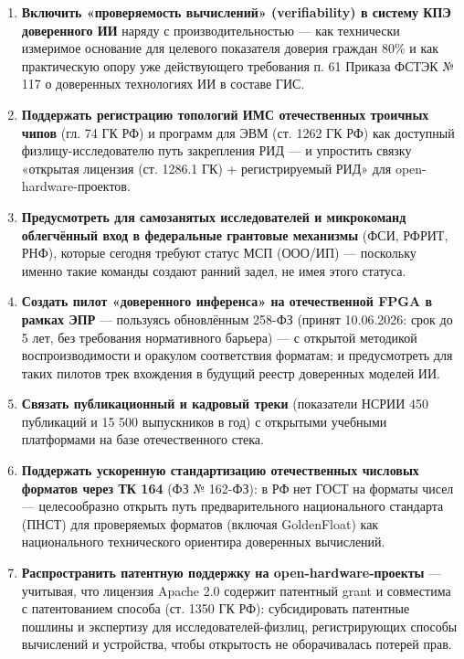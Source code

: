 \documentclass[
  russian,
]{article}
\providecommand{\tightlist}{%
  \setlength{\itemsep}{0pt}\setlength{\parskip}{0pt}}
\begin{document}
\begin{enumerate}
\def\labelenumi{\arabic{enumi}.}
\tightlist
\item
  \textbf{Включить «проверяемость вычислений» (verifiability) в систему
  КПЭ доверенного ИИ} наряду с производительностью --- как технически
  измеримое основание для целевого показателя доверия граждан 80\% и как
  практическую опору уже действующего требования п. 61 Приказа ФСТЭК №
  117 о доверенных технологиях ИИ в составе ГИС.
\item
  \textbf{Поддержать регистрацию топологий ИМС отечественных троичных
  чипов} (гл. 74 ГК РФ) и программ для ЭВМ (ст. 1262 ГК РФ) как
  доступный физлицу-исследователю путь закрепления РИД --- и упростить
  связку «открытая лицензия (ст. 1286.1 ГК) + регистрируемый РИД» для
  open-hardware-проектов.
\item
  \textbf{Предусмотреть для самозанятых исследователей и микрокоманд
  облегчённый вход в федеральные грантовые механизмы} (ФСИ, РФРИТ, РНФ),
  которые сегодня требуют статус МСП (ООО/ИП) --- поскольку именно такие
  команды создают ранний задел, не имея этого статуса.
\item
  \textbf{Создать пилот «доверенного инференса» на отечественной
  FPGA в рамках ЭПР} --- пользуясь обновлённым 258-ФЗ (принят
  10.06.2026: срок до 5 лет, без требования нормативного барьера) --- с
  открытой методикой воспроизводимости и оракулом соответствия форматам;
  и предусмотреть для таких пилотов трек вхождения в будущий реестр
  доверенных моделей ИИ.
\item
  \textbf{Связать публикационный и кадровый треки} (показатели НСРИИ 450
  публикаций и 15 500 выпускников в год) с открытыми учебными
  платформами на базе отечественного стека.
\item
  \textbf{Поддержать ускоренную стандартизацию отечественных числовых
  форматов через ТК 164} (ФЗ № 162-ФЗ): в РФ нет ГОСТ на форматы чисел
  --- целесообразно открыть путь предварительного национального
  стандарта (ПНСТ) для проверяемых форматов (включая GoldenFloat) как
  национального технического ориентира доверенных вычислений.
\item
  \textbf{Распространить патентную поддержку на open-hardware-проекты}
  --- учитывая, что лицензия Apache 2.0 содержит патентный grant и
  совместима с патентованием способа (ст. 1350 ГК РФ): субсидировать
  патентные пошлины и экспертизу для исследователей-физлиц,
  регистрирующих способы вычислений и устройства, чтобы открытость не
  оборачивалась потерей прав.
\end{enumerate}
\end{document}
